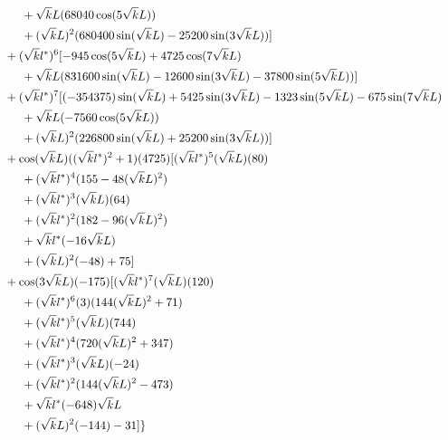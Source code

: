 \begin{align*}
        &\hspace{1cm}     +\sqrt{k}L  (68040 \cos(5\sqrt{k}L))\\
        &\hspace{1cm}     +(\sqrt{k}L)^2 (680400 \sin(\sqrt{k}L)-25200 \sin(3\sqrt{k}L))]\\
        &\hspace{0.5cm}+(\sqrt{k}l^*)^6 [-945 \cos(5\sqrt{k}L)+4725 \cos(7\sqrt{k}L)\\
        &\hspace{1cm}     +\sqrt{k}L  (831600 \sin(\sqrt{k}L)-12600 \sin(3\sqrt{k}L)-37800 \sin(5\sqrt{k}L))]\\
        &\hspace{0.5cm}+(\sqrt{k}l^*)^7 [(-354375) \sin(\sqrt{k}L) + 5425 \sin(3\sqrt{k}L)-1323 \sin(5\sqrt{k}L)-675 \sin(7\sqrt{k}L)\\
        &\hspace{1cm}+\sqrt{k}L  (-7560 \cos(5\sqrt{k}L))\\
        &\hspace{1cm}+(\sqrt{k}L)^2 (226800 \sin(\sqrt{k}L) + 25200 \sin(3\sqrt{k}L))]\\
        &\hspace{0.5cm}+\cos(\sqrt{k}L) ((\sqrt{k}l^*)^2+1)(4725)[(\sqrt{k}l^*)^5(\sqrt{k}L)(80)\\
        &\hspace{1cm}     +(\sqrt{k}l^*)^4 (155-48(\sqrt{k}L)^2)\\
        &\hspace{1cm}     +(\sqrt{k}l^*)^3 (\sqrt{k}L)(64)\\
        &\hspace{1cm}     +(\sqrt{k}l^*)^2 (182-96 (\sqrt{k}L)^2)\\
        &\hspace{1cm}     +\sqrt{k}l^*  (-16 \sqrt{k}L)\\
        &\hspace{1cm}     +(\sqrt{k}L)^2 (-48)+75]\\
        &\hspace{0.5cm}+\cos(3\sqrt{k}L) (-175) [(\sqrt{k}l^*)^7 (\sqrt{k}L) (120)\\
        &\hspace{1cm}    +(\sqrt{k}l^*)^6(3)(144(\sqrt{k}L)^2+71)\\
        &\hspace{1cm}    +(\sqrt{k}l^*)^5 (\sqrt{k}L) (744)\\
        &\hspace{1cm}    +(\sqrt{k}l^*)^4 (720(\sqrt{k}L)^2+347)\\
        &\hspace{1cm}    +(\sqrt{k}l^*)^3 (\sqrt{k}L)(-24)\\
        &\hspace{1cm}    +(\sqrt{k}l^*)^2 (144 (\sqrt{k}L)^2-473)\\
        &\hspace{1cm}    +\sqrt{k}l^* (-648) \sqrt{k}L\\
        &\hspace{1cm}    +(\sqrt{k}L)^2 (-144)-31]\}
 \end{align*}

